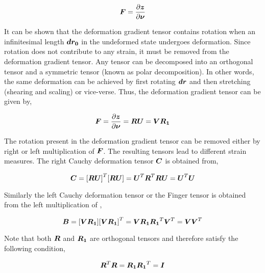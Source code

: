 \begin{equation}
  \matr{F}=\delby{\vect{z}}{\vect{\nu}}
  \label{eqn:deformationgradienttensor}
\end{equation}
 
It can be shown that the deformation gradient tensor contains rotation when an infinitesimal length $\vect{dr_{0}}$ in the undeformed state undergoes 
deformation. Since rotation does not contribute to any strain, it must be removed from the deformation gradient tensor. Any tensor can be decomposed 
into an orthogonal tensor and a symmetric tensor (known as polar decomposition). In other words, the same deformation can be achieved by first 
rotating $\vect{dr}$ and then stretching (shearing and scaling) or vice-verse. Thus, the deformation gradient tensor can be given by,

\begin{equation}
  \matr{F}=\delby{\vect{z}}{\vect{\nu}}=\matr{R}\matr{U}=\matr{V}\matr{R_{1}}
  \label{eqn:polardecomposition}
\end{equation}
 
The rotation present in the deformation gradient tensor can be removed either by right or left multiplication of $\matr{F}$. The resulting tensors 
lead to different strain measures. The right Cauchy deformation tensor $\matr{C}$ is obtained from,

\begin{equation}
  \matr{C}=\transpose{[\matr{R}\matr{U}]}[\matr{R}\matr{U}]=\transpose{\matr{U}}\transpose{\matr{R}}\matr{R}\matr{U}=\transpose{\matr{U}}\matr{U}
  \label{eqn:rightcauchy}
\end{equation}

Similarly the left Cauchy deformation tensor or the Finger tensor  is obtained from the left multiplication of ,

\begin{equation}
  \matr{B}=[\matr{V}\matr{R_{1}}]\transpose{[\matr{V}\matr{R_{1}}]}=\matr{V}\matr{R_{1}}\transpose{\matr{R_{1}}}\transpose{\matr{V}}=\matr{V}\transpose{\matr{V}}
  \label{eqn:leftcauchy}
\end{equation}

\noindent Note that both $\matr{R}$ and $\matr{R_{1}}$ are orthogonal tensors and therefore satisfy the following condition,

\begin{equation}
  \transpose{\matr{R}}\matr{R}=\matr{R_{1}}\transpose{\matr{R_{1}}}=\matr{I}
  \label{eqn:orthoganality}
\end{equation}

